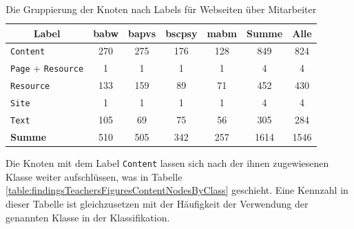     \begin{table}[htb]
        \centering
        \begin{tabular}{|l|c|c|c|c|c|c|}
            \hline
            \multicolumn{1}{|c|}{\textbf{Label}} & \textbf{\gls{babw}} & \textbf{\gls{bapvs}} & \textbf{\gls{bscpsy}} & \textbf{\gls{mabm}} & \textbf{Summe} & \textbf{Alle} \\ \hline
            \texttt{Content}                                     & 270           & 275            & 176             & 128           & 849            & 824           \\ \hline
            \texttt{Page} + \texttt{Resource}                             & 1             & 1              & 1               & 1             & 4              & 4             \\ \hline
            \texttt{Resource}                                    & 133           & 159            & 89              & 71            & 452            & 430           \\ \hline
            \texttt{Site}                                        & 1             & 1              & 1               & 1             & 4              & 4             \\ \hline
            \texttt{Text}                                        & 105           & 69             & 75              & 56            & 305            & 284           \\ \hline
            \hline
            \textbf{Summe}                              & 510           & 505            & 342             & 257           & 1614           & 1546          \\ \hline
        \end{tabular}
        \caption{Die Gruppierung der Knoten nach Labels für Webseiten über Mitarbeiter}
        \label{table:findingsTeachersFiguresNodesByLabel}
    \end{table}

    Die Knoten mit dem Label \texttt{Content} lassen sich nach der ihnen zugewiesenen Klasse
    weiter aufschlüssen, was in Tabelle \ref{table:findingsTeachersFiguresContentNodesByClass} geschieht.
    Eine Kennzahl in dieser Tabelle ist gleichzusetzen mit der Häufigkeit der Verwendung
    der genannten Klasse in der Klassifikation.

